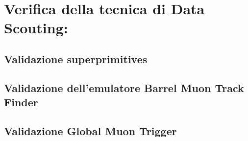 \chapter{Verifica della tecnica di Data Scouting:}



\section{Validazione superprimitives}




\section{Validazione dell'emulatore Barrel Muon Track Finder}

\section{Validazione Global Muon Trigger}

